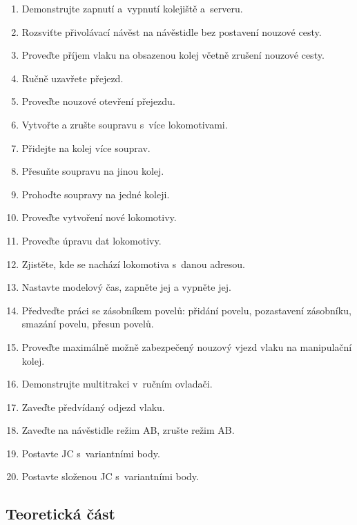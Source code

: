 \documentclass[12pt,a4paper]{article}
\begin{document}
\begin{enumerate}[leftmargin=*]
\item Demonstrujte zapnutí a~vypnutí kolejiště a~serveru.
\item Rozsviťte přivolávací návěst na návěstidle bez postavení nouzové cesty.
\item Proveďte příjem vlaku na obsazenou kolej včetně zrušení nouzové cesty.
\item Ručně uzavřete přejezd.
\item Proveďte nouzové otevření přejezdu.
\item Vytvořte a zrušte soupravu s~více lokomotivami.
\item Přidejte na kolej více souprav.
\item Přesuňte soupravu na jinou kolej.
\item Prohoďte soupravy na jedné koleji.
\item Proveďte vytvoření nové lokomotivy.
\item Proveďte úpravu dat lokomotivy.
\item Zjistěte, kde se nachází lokomotiva s~danou adresou.
\item Nastavte modelový čas, zapněte jej a vypněte jej.
\item Předveďte práci se zásobníkem povelů: přidání povelu, pozastavení
zásobníku, smazání povelu, přesun povelů.
\item Proveďte maximálně možně zabezpečený nouzový vjezd vlaku na manipulační
kolej.
\item Demonstrujte multitrakci v~ručním ovladači.
\item Zaveďte předvídaný odjezd vlaku.
\item Zaveďte na návěstidle režim AB, zrušte režim AB.
\item Postavte JC s~variantními body.
\item Postavte složenou JC s~variantními body.
\end{enumerate}

\newpage
\subsection{Teoretická část}
\end{document}

